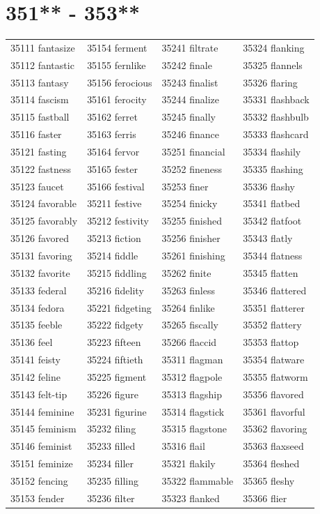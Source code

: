 \documentclass[10pt, oneside]{book}
\begin{document}
\begin{table}
	\centering
	\section*{351** - 353**}
	\begin{tabular}{l l l l}
35111 fantasize &35154 ferment &35241 filtrate &35324 flanking\\
35112 fantastic &35155 fernlike &35242 finale &35325 flannels\\
35113 fantasy &35156 ferocious &35243 finalist &35326 flaring\\
35114 fascism &35161 ferocity &35244 finalize &35331 flashback\\
35115 fastball &35162 ferret &35245 finally &35332 flashbulb\\
35116 faster &35163 ferris &35246 finance &35333 flashcard\\
35121 fasting &35164 fervor &35251 financial &35334 flashily\\
35122 fastness &35165 fester &35252 fineness &35335 flashing\\
35123 faucet &35166 festival &35253 finer &35336 flashy\\
35124 favorable &35211 festive &35254 finicky &35341 flatbed\\
35125 favorably &35212 festivity &35255 finished &35342 flatfoot\\
35126 favored &35213 fiction &35256 finisher &35343 flatly\\
35131 favoring &35214 fiddle &35261 finishing &35344 flatness\\
35132 favorite &35215 fiddling &35262 finite &35345 flatten\\
35133 federal &35216 fidelity &35263 finless &35346 flattered\\
35134 fedora &35221 fidgeting &35264 finlike &35351 flatterer\\
35135 feeble &35222 fidgety &35265 fiscally &35352 flattery\\
35136 feel &35223 fifteen &35266 flaccid &35353 flattop\\
35141 feisty &35224 fiftieth &35311 flagman &35354 flatware\\
35142 feline &35225 figment &35312 flagpole &35355 flatworm\\
35143 felt-tip &35226 figure &35313 flagship &35356 flavored\\
35144 feminine &35231 figurine &35314 flagstick &35361 flavorful\\
35145 feminism &35232 filing &35315 flagstone &35362 flavoring\\
35146 feminist &35233 filled &35316 flail &35363 flaxseed\\
35151 feminize &35234 filler &35321 flakily &35364 fleshed\\
35152 fencing &35235 filling &35322 flammable &35365 fleshy\\
35153 fender &35236 filter &35323 flanked &35366 flier\\
	\end{tabular}
 \end{table}
\clearpage
\end{document}
